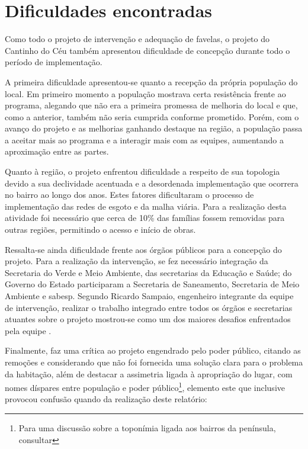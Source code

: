 	\section{Dificuldades encontradas}
	
	Como todo o projeto de intervenção e adequação de favelas, o projeto do Cantinho do Céu também apresentou dificuldade de concepção durante todo o período de implementação.
	
	A primeira dificuldade apresentou-se quanto a recepção da própria população do local. Em primeiro momento a população mostrava certa resistência frente ao programa, alegando que não era a primeira promessa de melhoria do local e que, como a anterior, também não seria cumprida conforme prometido. Porém, com o avanço do projeto e as melhorias ganhando destaque na região, a população passa a aceitar mais ao programa e a interagir mais com as equipes, aumentando a aproximação entre as partes.
	
	Quanto à região, o projeto enfrentou dificuldade a respeito de sua topologia devido a sua declividade acentuada e a desordenada implementação que ocorrera no bairro ao longo dos anos. Estes fatores dificultaram o processo de implementação das redes de esgoto e da malha viária. Para a realização desta atividade foi necessário que cerca de 10\% das famílias fossem removidas para outras regiões, permitindo o acesso e início de obras. 
	
	Ressalta-se ainda dificuldade frente aos órgãos públicos para a concepção do projeto. Para a realização da intervenção, se fez necessário integração da Secretaria do Verde e Meio Ambiente, das secretarias da Educação e Saúde; do Governo do Estado participaram a Secretaria de Saneamento, Secretaria de Meio Ambiente e \gls{sabesp}. Segundo Ricardo Sampaio, engenheiro integrante da equipe de intervenção, realizar o trabalho integrado entre todos os órgãos e secretarias atuantes sobre o projeto mostrou-se como um dos maiores desafios enfrentados pela equipe \cite[p.121]{Barda2012}.
	
	Finalmente,  faz uma crítica ao projeto engendrado pelo poder público, citando as remoções e considerando que não foi fornecida uma solução clara para o problema da habitação, além de destacar a assimetria ligada à apropriação do lugar, com nomes díspares entre população e poder público\footnote{Para uma discussão sobre a toponímia ligada aos bairros da península, consultar }, elemento este que inclusive provocou confusão quando da realização deste relatório:
	
